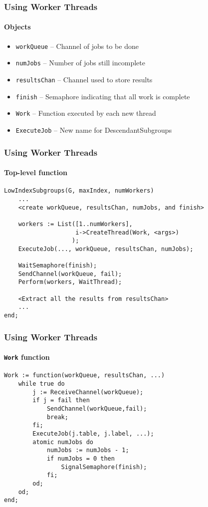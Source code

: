 \documentclass{beamer}
\begin{document}
\begin{frame}
  \frametitle{Using Worker Threads}
  \framesubtitle{Objects} \pause
  \begin{itemize}
  \item \texttt{workQueue} -- Channel of jobs to be done \pause
  \item \texttt{numJobs} -- Number of jobs still incomplete \pause
  \item \texttt{resultsChan} -- Channel used to store results \pause
  \item \texttt{finish} -- Semaphore indicating that all work is complete \pause
  \item \texttt{Work} -- Function executed by each new thread \pause
  \item \texttt{ExecuteJob} -- New name for DescendantSubgroups
  \end{itemize}
\end{frame}

\begin{frame}[fragile]
  \frametitle{Using Worker Threads}
  \framesubtitle{Top-level function}
\begin{verbatim}
LowIndexSubgroups(G, maxIndex, numWorkers)
    ...
    <create workQueue, resultsChan, numJobs, and finish>

    workers := List([1..numWorkers],
                    i->CreateThread(Work, <args>)
                   );
    ExecuteJob(..., workQueue, resultsChan, numJobs);

    WaitSemaphore(finish);
    SendChannel(workQueue, fail);
    Perform(workers, WaitThread);

    <Extract all the results from resultsChan>
    ...
end;
\end{verbatim}
\end{frame}

\begin{frame}[fragile]
  \frametitle{Using Worker Threads}
  \framesubtitle{\texttt{Work} function}
\begin{verbatim}
Work := function(workQueue, resultsChan, ...)
    while true do
        j := ReceiveChannel(workQueue);
        if j = fail then
            SendChannel(workQueue,fail);
            break;
        fi;
        ExecuteJob(j.table, j.label, ...);
        atomic numJobs do
            numJobs := numJobs - 1;
            if numJobs = 0 then
                SignalSemaphore(finish);
            fi;
        od;
    od;
end;
\end{verbatim}
\end{frame}
\end{document}

